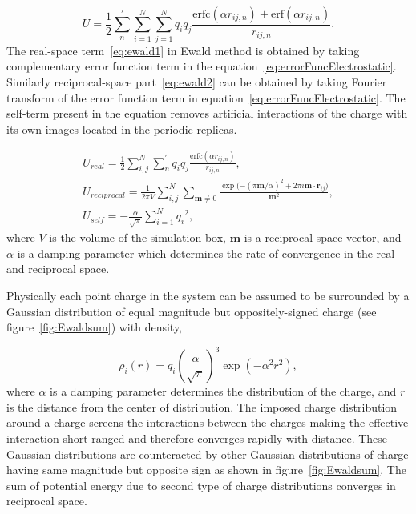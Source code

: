 \begin{equation}
U = \frac{1}{2}\sum_n^{'}{\sum_{i=1}^N { \sum_{j=1}^N {q_i q_j}}}\frac{\mathrm{erfc}(\alpha r_{ij,n})+\mathrm{erf}(\alpha r_{ij,n})}{r_{ij,n}}.
\label{eq:errorFuncElectrostatic}
\end{equation} 
The real-space term~\ref{eq:ewald1} in Ewald method is obtained by taking complementary error function term in the equation~\ref{eq:errorFuncElectrostatic}. Similarly reciprocal-space part~\ref{eq:ewald2} can be obtained by taking Fourier transform of the error function term in equation~\ref{eq:errorFuncElectrostatic}. The self-term present in the equation removes artificial interactions of the charge with its own images located in the periodic replicas. 

\begin{subequations}
\begin{gather}
U_{real} = \frac{1}{2} \sum_{i,j}^{N}{\sum_{n}^{'}{{q_i q_j}\frac{\mathrm{erfc}(\alpha r_{ij,n})}{r_{ij,n}}}}, \label{eq:ewald1}\\
U_{reciprocal} = \frac{1}{2\pi V}\sum_{i,j}^{N}{\sum_{\mathbf{m} \neq 0}\frac{\exp(-(\pi \mathbf{m}/\alpha)^2 + 2\pi i \mathbf{m}\cdot{\mathbf{r}_{ij})}}{\mathbf{m}^2}},\label{eq:ewald2} \\
U_{self} = -\frac{\alpha}{\sqrt{\pi}} \sum_{i =1}^{N} {q_i}^2 ,\label{eq:ewald3}
\end{gather}
\end{subequations}
where $V$ is the volume of the simulation box, $\mathbf{m}$ is a reciprocal-space vector, and $\alpha$ is a damping parameter which determines the rate of convergence in the real and reciprocal space. 
 
Physically each point charge in the system can be assumed to be surrounded by a Gaussian distribution of equal magnitude but oppositely-signed charge (see figure~\ref{fig:Ewaldsum}) with density,

\begin{equation}
\rho_i (r) = q_i \left(\frac{\alpha}{\sqrt{\pi}}\right)^3 \exp(-\alpha^2 r^2),
\label{eq:chargeDistribution}
\end{equation}
where $\alpha$ is a damping parameter determines the distribution of the charge, and $r$ is the distance from the center of distribution. The imposed charge distribution around a charge screens the interactions between the charges making the effective interaction  short ranged and therefore converges rapidly with distance. These Gaussian distributions are counteracted by other Gaussian distributions of charge having same magnitude but opposite sign as shown in figure~\ref{fig:Ewaldsum}. \cite{Toukmaji96} The sum of potential energy due to second type of charge distributions converges in reciprocal space. 

